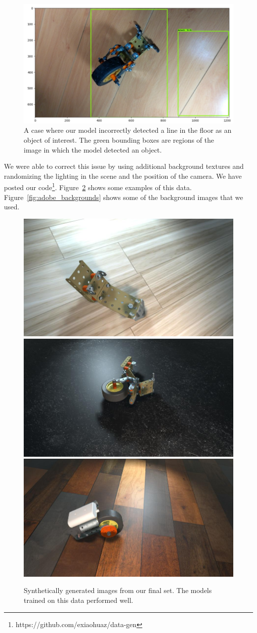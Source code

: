 \begin{figure}
  \includegraphics[width=\columnwidth]{figures/synthetic/false_positive.png}
  \caption{
    A case where our model incorrectly detected a line in the floor as an
    object of interest.
    The green bounding boxes are regions of the image in which the model
    detected an object.
  }\label{fig:false_positive}
\end{figure}

We were able to correct this issue by using additional background textures and
randomizing the lighting in the scene and the position of the camera.
We have posted our code\footnote{https://github.com/exiaohuaz/data-gen}.
Figure~\ref{fig:good_data} shows some examples of this data.
Figure~\ref{fig:adobe_backgrounds} shows some of the background images that we
used.

\begin{figure}
  \includegraphics[width=0.5\columnwidth]{figures/synthetic/floor1.jpg}
  \includegraphics[width=0.5\columnwidth]{figures/synthetic/floor2.jpg}
  \includegraphics[width=0.5\columnwidth]{figures/synthetic/floor3.jpg}
  \caption{
    Synthetically generated images from our final set. The models trained on
    this data performed well.
  }\label{fig:good_data}
\end{figure}

